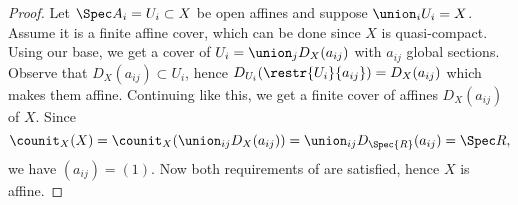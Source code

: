 
\begin{proof}
Let $\Spec A_i = U_i \subset X$ be open affines
and suppose $\union_i U_i = X$.
Assume it is a finite affine cover, which can be done since $X$ is quasi-compact.
Using our base, 
we get a cover of $U_i = \union_j D_X(a_{ij})$ 
with $a_{ij}$ global sections.
Observe that $D_X(a_{ij})\subset U_i$, 
hence $D_{U_i}(\restr{U_i}{a_{ij}}) = D_X(a_{ij})$
which makes them affine.
Continuing like this, 
we get a finite cover of affines $D_X(a_{ij})$ of $X$.
Since 
\[ \counit_X(X) = \counit_X(\union_{ij} D_X(a_{ij})) = \union_{ij} D_{\Spec{R}}(a_{ij}) = \Spec R,\]
we have $(a_{ij})=(1)$.
Now both requirements of  are satisfied,
hence $X$ is affine.
\end{proof}